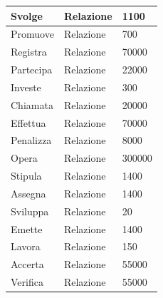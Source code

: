 \documentclass[11pt]{article}
\begin{document}
\begin{center}
\begin{tabular}{ |l|l|l| }
        \hline
        Svolge & Relazione & 1100 \\
        \hline
        Promuove & Relazione & 700 \\
        \hline
        Registra & Relazione & 70000 \\
        \hline
        Partecipa & Relazione & 22000 \\
        \hline
        Investe & Relazione & 300 \\
        \hline
        Chiamata & Relazione & 20000 \\
        \hline
        Effettua & Relazione & 70000 \\
        \hline
        Penalizza & Relazione & 8000 \\
        \hline
        Opera & Relazione & 300000 \\ %
        \hline
        Stipula & Relazione & 1400 \\
        \hline
        Assegna & Relazione & 1400 \\
        \hline
        Sviluppa & Relazione & 20 \\
        \hline
        Emette & Relazione & 1400 \\
        \hline
        Lavora & Relazione & 150 \\
        \hline
        Accerta & Relazione & 55000 \\
        \hline
        Verifica & Relazione & 55000 \\
        \hline
    \end{tabular}
\end{center}
\end{document}
